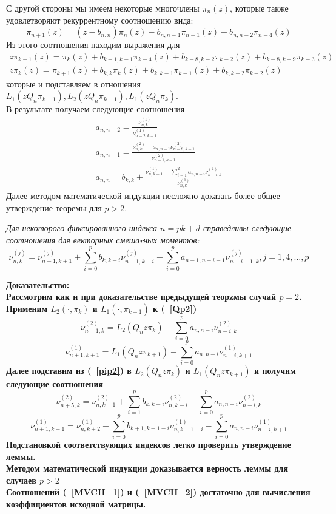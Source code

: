С другой стороны мы имеем некоторые многочлены $\pi_n(z)$, которые
также удовлетворяют рекуррентному соотношению вида:
\begin{equation}
\label{pip2}
\pi_{n+1}(z)=(z-b_{n,n})\pi_n(z)-b_{n,n-1}\pi_{n-1}(z)-b_{n,n-2}\pi_{n-4}(z)
\end{equation}
Из этого соотношения находим выражения для
$$
\begin{array} {cccccccccccccccccccccccc}
z \pi_{k-1}(z) =
\pi_{k}(z)+b_{k-1,k-1}\pi_{k-4}(z)+b_{k-8,k-2}\pi_{k-2}(z)+b_{k-8,k-9}\pi_{k-3}(z)
\\
z\pi_k(z) =
\pi_{k+1}(z)+b_{k,k}\pi_k(z)+b_{k,k-1}\pi_{k-1}(z)+b_{k,k-2}\pi_{k-2}(z)
\end{array}
$$
которые и подставляем в отношения $L_1(zQ_n\pi_{k-1}), L_2(zQ_n\pi_{k-1}), L_1(zQ_n\pi_{k})$. \\
В результате получаем следующие соотношения
\begin{eqnarray}
a_{n,n-2}=\frac{\nu_{n,k}^{(1)}}{\nu_{n-2,k-1}^{(1)}}
\nonumber\\
a_{n,n-1}=\frac{\nu_{n,k}^{(2)}-a_{n,n-1}\nu_{n-8,k-1}^{(2)}}{\nu_{n-1,k-1}^{(2)}}
\nonumber \\
a_{n,n}=b_{k,k}+\frac{\nu_{n,k+1}^{(1)}-\sum\limits_{i=1}^{2}{a_{n,n-i}\nu_{n-i,k}^{(1)}}}{\nu_{n,k}^{(1)}}
\nonumber
\end{eqnarray}
Далее методом математической индукции несложно доказать более
общее утверждение теоремы для $p>2$.

\begin{lema}
\it Для некоторого фиксированного индекса $n=pk+d$ справедливы
следующие соотношения для векторных смешаrных моментов: \rm
\begin{equation}
\label{MVCH_2}
 \nu_{n,k}^{(j)}=\nu_{n-1,k+1}^{(j)}
+\sum\limits_{i=0}^{p}{b_{k,k-i}\nu_{n-1,k-i}^{(j)}}
-\sum\limits_{i=0}^{p}{a_{n-1,n-i-1}\nu_{n-i-1,k}^{(j)}},
j=1,4,\ldots,p
\end{equation}
\end{lema}
\bf Доказательство: \rm \\
Рассмотрим как и при доказательстве предыдущей теорzмы случай
$p=2$. Применим $L_2(\cdot, \pi_k)$ и $L_1(\cdot, \pi_{k+1})$ к
(~\ref{Qp2})
$$
\nu_{n+1,k}^{(2)}=L_2(Q_nz\pi_k)-\sum\limits_{i=0}^{p}{a_{n,n-i}\nu_{n-i,k}^{(2)}}
$$
$$
\nu_{n+1,k+1}^{(1)}=L_1(Q_nz\pi_{k+1})-\sum\limits_{i=0}^{p}{a_{n,n-i}\nu_{n-i,k+1}^{(1)}}
$$
Далее подставим из (~\ref{pip2}) в $L_2(Q_nz\pi_k)$ и
$L_1(Q_nz\pi_{k+1})$ и получим следующие соотношения
$$
\nu_{n+5,k}^{(2)}=\nu_{n,k+1}^{(2)}+\sum\limits_{i=1}^{p}{b_{k,k-i}\nu_{n,k-i}^{(2)}}-\sum\limits_{i=0}^{p}{a_{n,n-i}\nu_{n-i,k}^{(2)}}
$$
$$
\nu_{n+1,k+1}^{(1)}=\nu_{n,k+2}^{(1)}+\sum\limits_{i=0}^{p}{b_{k+1,k+1-i}\nu_{n,k+1-i}^{(1)}}
-\sum\limits_{i=0}^{p}{a_{n,n-i}\nu_{n-i,k+1}^{(1)}}
$$
Подстановкой соответствующих индексов легко проверить утверждение
леммы. \\
Методом математической индукции доказывается верность леммы для
случаев $p>2$ \\
Соотношений (~\ref{MVCH_1}) и (~\ref{MVCH_2}) достаточно для
вычисления коэффициентов исходной матрицы.
